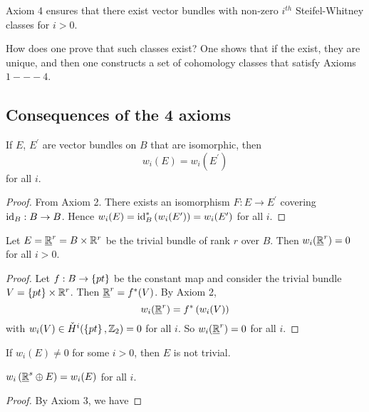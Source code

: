 \documentclass[main.tex]{subfiles}
\begin{document}
\begin{note}
  Axiom 4 ensures that there exist vector bundles with non-zero $i^{th}$ Steifel-Whitney classes for $i > 0$.
\end{note}

How does one prove that such classes exist? One shows that if the exist, they are unique, and then one constructs a set of cohomology classes that satisfy Axioms $1 --- 4$.

\subsection{Consequences of the 4 axioms}

\begin{prop}
  If $E$, $E^\prime$ are vector bundles on $B$ that are isomorphic, then
  \[
  w_i(E) = w_i(E^\prime)
  \] for all $i$.
\end{prop}

\begin{proof}
  From Axiom 2. There exists an isomorphism $F: E \to E^\prime$ covering $\text{id}_{B}: B\to B$. Hence $w_i(E) = \text{id}_{B}^*\left( w_i(E^\prime) \right) = w_i(E^\prime)$ for all $i$.
\end{proof}

\begin{prop}
  Let $E = \underline{\mathbb{R}}^r = B \times \mathbb{R}^r$ be the trivial bundle of rank $r$ over $B$. Then $w_i(\underline{\mathbb{R}}^r) = 0$ for all $i > 0$.
\end{prop}

\begin{proof}
  Let $f: B \to \left\{pt\right\}$ be the constant map and consider the trivial bundle $V = \left\{pt\right\} \times \mathbb{R}^r$. Then $\underline{\mathbb{R}}^r = f^*(V)$. By Axiom 2,
  \[
  w_i(\underline{\mathbb{R}}^r) = f^*\left(  w_i(V) \right)
  \] with $w_i(V) \in \check{H}^i(\left\{pt\right\}, \mathbb{Z}_2) = 0$ for all $i$. So $w_i(\underline{\mathbb{R}}^r) = 0$ for all $i$.
\end{proof}

\begin{cor}
  If $w_i(E) \neq 0$ for some $i > 0$, then $E$ is not trivial.
\end{cor}

\begin{prop}
  $w_i\left(  \underline{\mathbb{R}}^s \oplus E \right) = w_i(E)$ for all $i$.
\end{prop}

\begin{proof}
  By Axiom 3, we have
\end{proof}
\end{document}
